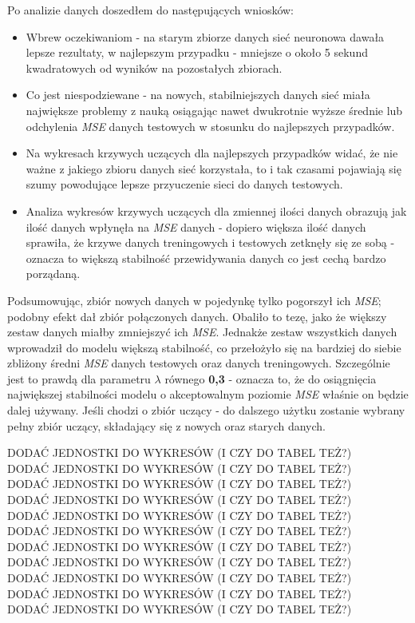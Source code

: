 \documentclass[12pt]{aghdpl}
\begin{document}
		Po analizie danych doszedłem do następujących wniosków:
		\begin{itemize}
		\item Wbrew oczekiwaniom - na starym zbiorze danych sieć neuronowa dawała lepsze rezultaty, w najlepszym przypadku - mniejsze o około 5 sekund kwadratowych od wyników na pozostałych zbiorach.
		\item Co jest niespodziewane - na nowych, stabilniejszych danych sieć miała największe problemy z nauką osiągając nawet dwukrotnie wyższe średnie lub odchylenia \textit{MSE} danych testowych w stosunku do najlepszych przypadków.
		\item Na wykresach krzywych uczących dla najlepszych przypadków widać, że nie ważne z jakiego zbioru danych sieć korzystała, to i tak czasami pojawiają się szumy powodujące lepsze przyuczenie sieci do danych testowych.
		\item Analiza wykresów krzywych uczących dla zmiennej ilości danych obrazują jak ilość danych wpłynęła na \textit{MSE} danych - dopiero większa ilość danych sprawiła, że krzywe danych treningowych i testowych zetknęły się ze sobą - oznacza to większą stabilność przewidywania danych co jest cechą bardzo porządaną.
		\end{itemize}
		
		Podsumowując, zbiór nowych danych w pojedynkę tylko pogorszył ich \textit{MSE}; podobny efekt dał zbiór połączonych danych. Obaliło to tezę, jako że większy zestaw danych miałby zmniejszyć ich \textit{MSE}. Jednakże zestaw wszystkich danych wprowadził do modelu większą stabilność, co przełożyło się na bardziej do siebie zbliżony średni \textit{MSE} danych testowych oraz danych treningowych. Szczególnie jest to prawdą dla parametru $\lambda$ równego \textbf{0,3} - oznacza to, że do osiągnięcia największej stabilności modelu o akceptowalnym poziomie \textit{MSE} właśnie on będzie dalej używany. Jeśli chodzi o zbiór uczący - do dalszego użytku zostanie wybrany pełny zbiór uczący, składający się z nowych oraz starych danych.
				
		\newpage
		\newpage
		DODAĆ JEDNOSTKI DO WYKRESÓW (I CZY DO TABEL TEŻ?) \\
		DODAĆ JEDNOSTKI DO WYKRESÓW (I CZY DO TABEL TEŻ?) \\
		DODAĆ JEDNOSTKI DO WYKRESÓW (I CZY DO TABEL TEŻ?) \\
		DODAĆ JEDNOSTKI DO WYKRESÓW (I CZY DO TABEL TEŻ?) \\
		DODAĆ JEDNOSTKI DO WYKRESÓW (I CZY DO TABEL TEŻ?) \\
		DODAĆ JEDNOSTKI DO WYKRESÓW (I CZY DO TABEL TEŻ?) \\
		DODAĆ JEDNOSTKI DO WYKRESÓW (I CZY DO TABEL TEŻ?) \\
		DODAĆ JEDNOSTKI DO WYKRESÓW (I CZY DO TABEL TEŻ?) \\
		DODAĆ JEDNOSTKI DO WYKRESÓW (I CZY DO TABEL TEŻ?) \\
		DODAĆ JEDNOSTKI DO WYKRESÓW (I CZY DO TABEL TEŻ?) \\
		DODAĆ JEDNOSTKI DO WYKRESÓW (I CZY DO TABEL TEŻ?)
		
		\printbibliography
\end{document}
